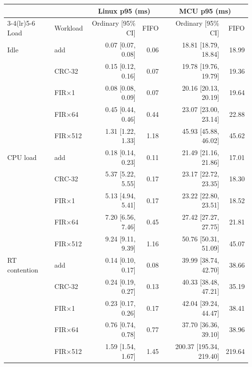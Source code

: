 \begin{tabular}{llrrrr}
\toprule
 & & \multicolumn{2}{c}{Linux p95 (ms)} & \multicolumn{2}{c}{MCU p95 (ms)} \\
\cmidrule(lr){3-4}\cmidrule(lr){5-6}
Load & Workload & Ordinary [95\% CI] & FIFO & Ordinary [95\% CI] & FIFO \\
\midrule
Idle & add & 0.07 [0.07, 0.08] & 0.06 & 18.81 [18.79, 18.84] & 18.99 \\
 & CRC-32 & 0.15 [0.12, 0.16] & 0.07 & 19.78 [19.76, 19.79] & 19.36 \\
 & FIR$\times$1 & 0.08 [0.08, 0.09] & 0.07 & 20.16 [20.13, 20.19] & 19.64 \\
 & FIR$\times$64 & 0.45 [0.44, 0.46] & 0.44 & 23.07 [23.00, 23.14] & 22.88 \\
 & FIR$\times$512 & 1.31 [1.22, 1.33] & 1.18 & 45.93 [45.88, 46.02] & 45.62 \\
\midrule
CPU load & add & 0.18 [0.14, 0.23] & 0.11 & 21.49 [21.16, 21.86] & 17.01 \\
 & CRC-32 & 5.37 [5.22, 5.55] & 0.17 & 23.17 [22.72, 23.35] & 18.30 \\
 & FIR$\times$1 & 5.13 [4.94, 5.41] & 0.17 & 23.22 [22.80, 23.51] & 18.52 \\
 & FIR$\times$64 & 7.20 [6.56, 7.46] & 0.45 & 27.42 [27.27, 27.75] & 21.81 \\
 & FIR$\times$512 & 9.24 [9.11, 9.39] & 1.16 & 50.76 [50.31, 51.09] & 45.07 \\
\midrule
RT contention & add & 0.14 [0.10, 0.17] & 0.08 & 39.99 [38.74, 42.70] & 38.66 \\
 & CRC-32 & 0.24 [0.19, 0.27] & 0.13 & 40.33 [38.48, 47.21] & 35.19 \\
 & FIR$\times$1 & 0.23 [0.17, 0.26] & 0.17 & 42.04 [39.24, 44.47] & 38.41 \\
 & FIR$\times$64 & 0.76 [0.74, 0.78] & 0.77 & 37.70 [36.36, 39.10] & 38.96 \\
 & FIR$\times$512 & 1.59 [1.54, 1.67] & 1.45 & 200.37 [195.34, 219.40] & 219.64 \\
\bottomrule
\end{tabular}
